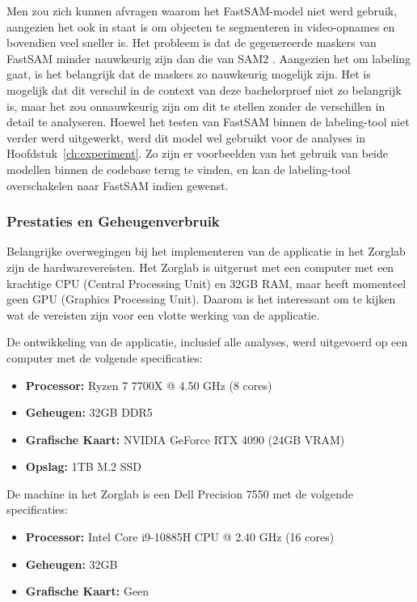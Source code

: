 Men zou zich kunnen afvragen waarom het FastSAM-model niet werd gebruik, aangezien het ook in staat is om objecten te segmenteren in video-opnames en bovendien veel sneller is.
Het probleem is dat de gegenereerde maskers van FastSAM minder nauwkeurig zijn dan die van SAM2 \autocite{Zhao2023}. 
Aangezien het om labeling gaat, is het belangrijk dat de maskers zo nauwkeurig mogelijk zijn.
Het is mogelijk dat dit verschil in de context van deze bachelorproef niet zo belangrijk is, maar het zou onnauwkeurig zijn om dit te stellen zonder de verschillen in detail te analyseren.
Hoewel het testen van FastSAM binnen de labeling-tool niet verder werd uitgewerkt, werd dit model wel gebruikt voor de analyses in Hoofdstuk~\ref{ch:experiment}.
Zo zijn er voorbeelden van het gebruik van beide modellen binnen de codebase terug te vinden, en kan de labeling-tool overschakelen naar FastSAM indien gewenst.

\subsubsection{Prestaties en Geheugenverbruik}

Belangrijke overwegingen bij het implementeren van de applicatie in het Zorglab zijn de hardwarevereisten.
Het Zorglab is uitgerust met een computer met een krachtige CPU (Central Processing Unit) en 32GB RAM, maar heeft momenteel geen GPU (Graphics Processing Unit).
Daarom is het interessant om te kijken wat de vereisten zijn voor een vlotte werking van de applicatie.

De ontwikkeling van de applicatie, inclusief alle analyses, werd uitgevoerd op een computer met de volgende specificaties:
\begin{itemize}
    \item \textbf{Processor:} Ryzen 7 7700X @ 4.50 GHz (8 cores)
    \item \textbf{Geheugen:} 32GB DDR5
    \item \textbf{Grafische Kaart:} NVIDIA GeForce RTX 4090 (24GB VRAM)
    \item \textbf{Opslag:} 1TB M.2 SSD
\end{itemize}

De machine in het Zorglab is een Dell Precision 7550 met de volgende specificaties:
\begin{itemize}
    \item \textbf{Processor:} Intel Core i9-10885H CPU @ 2.40 GHz (16 cores)
    \item \textbf{Geheugen:} 32GB
    \item \textbf{Grafische Kaart:} Geen
\end{itemize}

